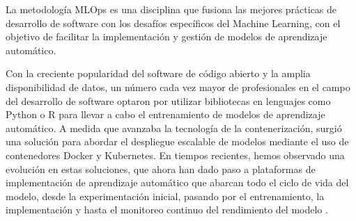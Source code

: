 \newpage
La metodología MLOps es una disciplina que fusiona las mejores prácticas de desarrollo de software con los desafíos específicos del Machine Learning, con el objetivo de facilitar la implementación y gestión de modelos de aprendizaje automático. 

Con la creciente popularidad del software de código abierto y la amplia disponibilidad de datos, un número cada vez mayor de profesionales en el campo del desarrollo de software optaron por utilizar bibliotecas en lenguajes como Python o R para llevar a cabo el entrenamiento de modelos de aprendizaje automático. A medida que avanzaba la tecnología de la contenerización, surgió una solución para abordar el despliegue escalable de modelos mediante el uso de contenedores Docker y Kubernetes. En tiempos recientes, hemos observado una evolución en estas soluciones, que ahora han dado paso a plataformas de implementación de aprendizaje automático que abarcan todo el ciclo de vida del modelo, desde la experimentación inicial, pasando por el entrenamiento, la implementación y hasta el monitoreo continuo del rendimiento del modelo \citep{visengeriyeva2020}.
\newpage

